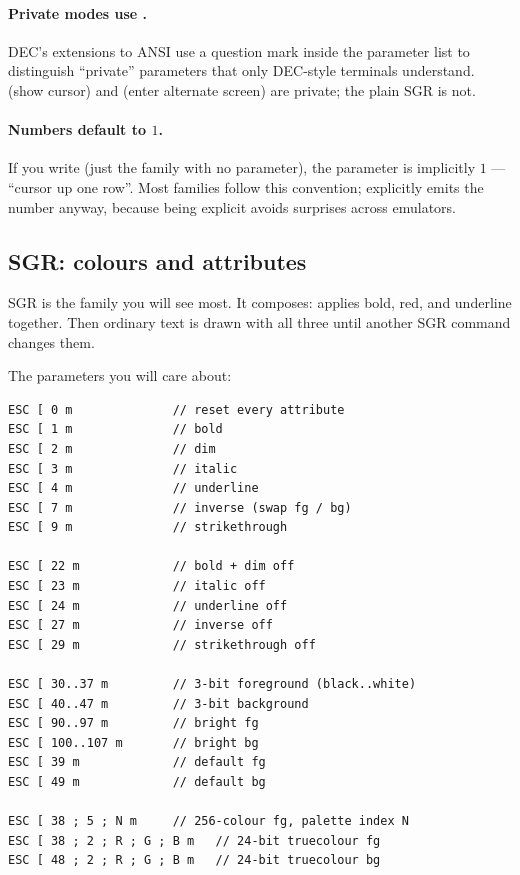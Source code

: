 \paragraph{Private modes use .}
DEC's extensions to ANSI use a question mark inside the parameter list
to distinguish ``private'' parameters that only DEC-style terminals
understand. \code{ESC [ ? 25 h} (show cursor) and
\code{ESC [ ? 1049 h} (enter alternate screen) are private; the plain
SGR \code{ESC [ 1 m} is not.

\paragraph{Numbers default to $1$.}
If you write \code{ESC [ A} (just the family with no parameter), the
parameter is implicitly $1$ --- ``cursor up one row''. Most families
follow this convention; \maya{} explicitly emits the number anyway,
because being explicit avoids surprises across emulators.

\subsection{SGR: colours and attributes}

SGR is the family you will see most. It composes: \code{ESC [ 1 ; 31
; 4 m} applies bold, red, and underline together. Then ordinary text
is drawn with all three until another SGR command changes them.

The parameters you will care about:

\begin{lstlisting}
ESC [ 0 m              // reset every attribute
ESC [ 1 m              // bold
ESC [ 2 m              // dim
ESC [ 3 m              // italic
ESC [ 4 m              // underline
ESC [ 7 m              // inverse (swap fg / bg)
ESC [ 9 m              // strikethrough

ESC [ 22 m             // bold + dim off
ESC [ 23 m             // italic off
ESC [ 24 m             // underline off
ESC [ 27 m             // inverse off
ESC [ 29 m             // strikethrough off

ESC [ 30..37 m         // 3-bit foreground (black..white)
ESC [ 40..47 m         // 3-bit background
ESC [ 90..97 m         // bright fg
ESC [ 100..107 m       // bright bg
ESC [ 39 m             // default fg
ESC [ 49 m             // default bg

ESC [ 38 ; 5 ; N m     // 256-colour fg, palette index N
ESC [ 38 ; 2 ; R ; G ; B m   // 24-bit truecolour fg
ESC [ 48 ; 2 ; R ; G ; B m   // 24-bit truecolour bg
\end{lstlisting}

